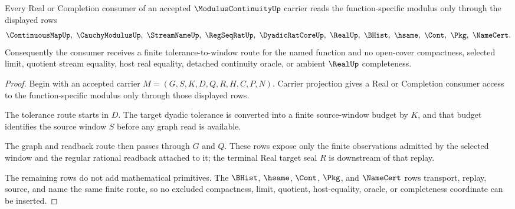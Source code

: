 \begin{theorem}
\label{thm:modulus-continuity-real-completion-handoff}
Every Real or Completion consumer of an accepted $\ModulusContinuityUp$ carrier reads the function-specific modulus only through the displayed rows
$$
\ContinuousMapUp,\ \CauchyModulusUp,\ \StreamNameUp,\ \RegSeqRatUp,\ \DyadicRatCoreUp,\ \RealUp,\ \BHist,\ \hsame,\ \Cont,\ \Pkg,\ \NameCert .
$$
Consequently the consumer receives a finite tolerance-to-window route for the named function and no open-cover compactness, selected limit, quotient stream equality, host real equality, detached continuity oracle, or ambient $\RealUp$ completeness.
\end{theorem}
\begin{proof}
Begin with an accepted carrier $M=(G,S,K,D,Q,R,H,C,P,N)$. Carrier projection gives a Real or Completion consumer access to the function-specific modulus only through those displayed rows.

The tolerance route starts in $D$. The target dyadic tolerance is converted into a finite source-window budget by $K$, and that budget identifies the source window $S$ before any graph read is available.

The graph and readback route then passes through $G$ and $Q$. These rows expose only the finite observations admitted by the selected window and the regular rational readback attached to it; the terminal Real target seal $R$ is downstream of that replay.

The remaining rows do not add mathematical primitives. The $\BHist$, $\hsame$, $\Cont$, $\Pkg$, and $\NameCert$ rows transport, replay, source, and name the same finite route, so no excluded compactness, limit, quotient, host-equality, oracle, or completeness coordinate can be inserted.
\end{proof}

